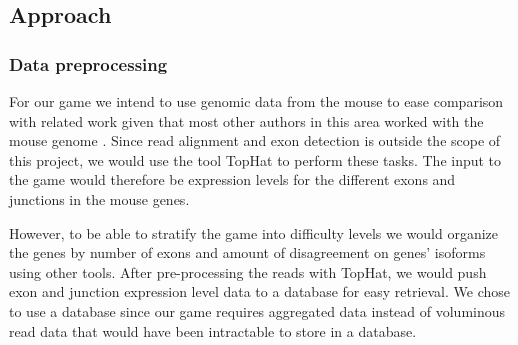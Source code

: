 \documentclass[12pt]{article}
\begin{document}
\subsection*{Approach}
\subsubsection*{Data preprocessing}
For our game we intend to use genomic data from the mouse to ease comparison with related work given that most other authors in this area worked with the mouse genome \citep{trapnell2010transcript,guttman2010ab,feng2010inference,li2011isolasso}. Since read alignment and exon detection is outside the scope of this project, we would use the tool TopHat \citep{trapnell2009tophat} to perform these tasks. The input to the game would therefore be expression levels for the different exons and junctions in the mouse genes. 

However, to be able to stratify the game into difficulty levels we would organize the genes by number of exons and amount of disagreement on genes' isoforms using other tools. After pre-processing the reads with TopHat, we would push exon and junction expression level data to a database for easy retrieval. We chose to use a database since our game requires aggregated data instead of voluminous read data that would have been intractable to store in a database.
\end{document}
